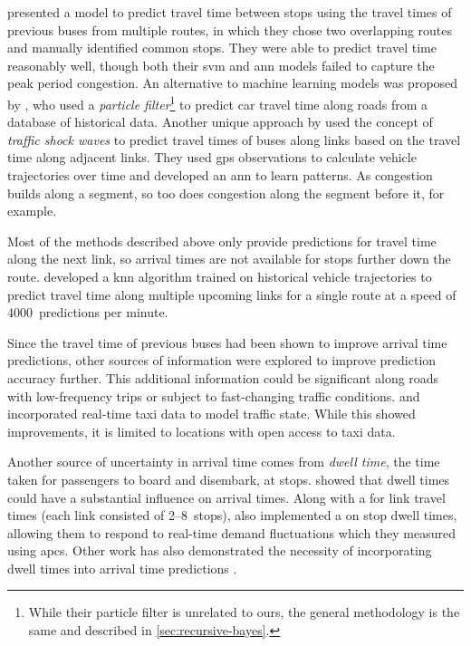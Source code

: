  presented a model to predict travel time between stops using the travel times of previous buses from multiple routes, in which they chose two overlapping routes and manually identified common stops. They were able to predict travel time reasonably well, though both their \gls{svm} and \gls{ann} models failed to capture the peak period congestion. An alternative to machine learning models was proposed by \citet{Chen_2014}, who used a \emph{particle filter}\footnote{While their particle filter is unrelated to ours, the general methodology is the same and described in \cref{sec:recursive-bayes}.} to predict car travel time along roads from a database of historical data. Another unique approach by \citet{Julio_2016} used the concept of \emph{traffic shock waves} to predict travel times of buses along links based on the travel time along adjacent links. They used \gls{gps} observations to calculate vehicle trajectories over time and developed an \gls{ann} to learn patterns. As congestion builds along a segment, so too does congestion along the segment before it, for example.


Most of the methods described above only provide predictions for travel time along the next link, so arrival times are not available for stops further down the route.  developed a \gls{knn} algorithm trained on historical vehicle trajectories to predict travel time along multiple upcoming links for a single route at a speed of 4000~predictions per minute.


Since the travel time of previous buses had been shown to improve arrival time predictions, other sources of information were explored to improve prediction accuracy further. This additional information could be significant along roads with low-frequency trips or subject to fast-changing traffic conditions.  and \citet{Ma_2019} incorporated real-time taxi data to model traffic state. While this showed improvements, it is limited to locations with open access to taxi data.


Another source of uncertainty in arrival time comes from \emph{dwell time}, the time taken for passengers to board and disembark, at stops.  showed that dwell times could have a substantial influence on arrival times. Along with a \kf{} for link travel times (each link consisted of 2--8~stops), \citeauthor{Shalaby_2004} also implemented a \kf{} on stop dwell times, allowing them to respond to real-time demand fluctuations which they measured using \glspl{apc}. Other work has also demonstrated the necessity of incorporating dwell times into arrival time predictions \citep{Jeong_2005,Cats_2015,Cats_2016}.


